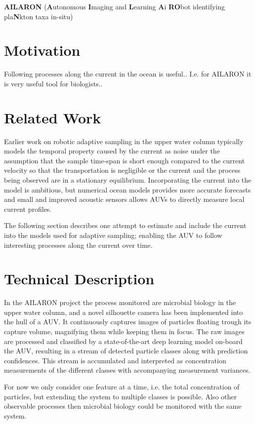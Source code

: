 \documentclass[conference]{IEEEtran}
\begin{document}
\textbf{AILARON} (\textbf{A}utonomous
\textbf{I}maging and \textbf{L}earning \textbf{A}i \textbf{RO}bot
identifying pla\textbf{N}kton taxa in-situ)

\section{Motivation}
Following processes along the current in the ocean is useful..
I.e. for AILARON it is very useful tool for biologists.. 

\section{Related Work}
Earlier work on robotic adaptive sampling in the upper water column typically models the temporal property caused by the current as noise under the assumption that the sample time-span is short enough compared to the current velocity so that the transportation is negligible or the current and the process being observed are in a stationary equilibrium.
Incorporating the current into the model is ambitious, but numerical ocean models provides more accurate forecasts and small and improved acoustic sensors allows AUVs to directly measure local current profiles.


The following section describes one attempt to estimate and include the current into the models used for adaptive sampling; enabling the AUV to follow interesting processes along the current over time.

\section{Technical Description}
In the AILARON project the process monitored are microbial biology in the upper water column, and a novel silhouette camera has been implemented into the hull of a AUV.
It continuously captures images of particles floating trough its capture volume, magnifying them while keeping them in focus.
The raw images are processed and classified by a state-of-the-art deep learning model on-board the AUV, resulting in a stream of detected particle classes along with prediction confidences.
This stream is accumulated and interpreted as concentration measurements of the different classes with accompanying measurement variances.

For now we only consider one feature at a time, i.e. the total concentration of particles, but extending the system to multiple classes is possible.
Also other observable processes then microbial biology could be monitored with the same system. 
\end{document}
